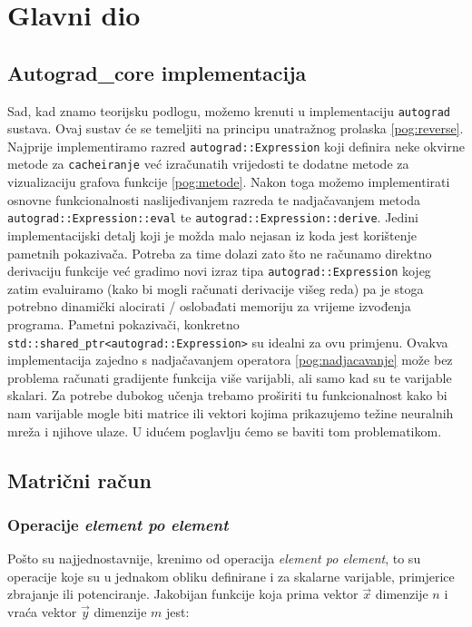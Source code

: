 \documentclass[zavrsnirad]{fer}
\begin{document}
\chapter{Glavni dio}
\label{pog:glavni_dio}

\section{Autograd\_core implementacija}
Sad, kad znamo teorijsku podlogu, možemo krenuti u implementaciju \texttt{autograd} sustava. Ovaj sustav će se temeljiti na principu unatražnog prolaska \ref{pog:reverse}. Najprije implementiramo razred \texttt{autograd::Expression} koji definira neke okvirne metode za \texttt{cacheiranje} već izračunatih vrijedosti te dodatne metode za vizualizaciju grafova funkcije \ref{pog:metode}. Nakon toga možemo implementirati osnovne funkcionalnosti naslijeđivanjem razreda te nadjačavanjem metoda \texttt{autograd::Expression::eval} te \texttt{autograd::Expression::derive}. Jedini implementacijski detalj koji je možda malo nejasan iz koda jest korištenje pametnih pokazivača. Potreba za time dolazi zato što ne računamo direktno derivaciju funkcije već gradimo novi izraz tipa \texttt{autograd::Expression} kojeg zatim evaluiramo (kako bi mogli računati derivacije višeg reda) pa je stoga potrebno dinamički alocirati / oslobađati memoriju za vrijeme izvođenja programa. Pametni pokazivači, konkretno \texttt{std::shared\_ptr<autograd::Expression>} su idealni za ovu primjenu. Ovakva implementacija zajedno s nadjačavanjem operatora \ref{pog:nadjacavanje} može bez problema računati gradijente funkcija više varijabli, ali samo kad su te varijable skalari. Za potrebe dubokog učenja trebamo proširiti tu funkcionalnost kako bi nam varijable mogle biti matrice ili vektori kojima prikazujemo težine neuralnih mreža i njihove ulaze. U idućem poglavlju ćemo se baviti tom problematikom.



\pagebreak
\section{Matrični račun}
\subsection{Operacije \textit{element po element}}
Pošto su najjednostavnije, krenimo od operacija \textit{element po element}, to su operacije koje su u jednakom obliku definirane i za skalarne varijable, primjerice zbrajanje ili potenciranje. Jakobijan funkcije koja prima vektor $\vec{x}$ dimenzije $n$ i vraća vektor $\vec{y}$ dimenzije $m$ jest:
\end{document}
